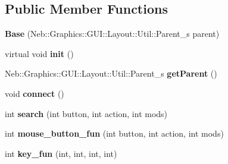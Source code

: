 \subsection*{Public Member Functions}
\begin{DoxyCompactItemize}
\item 
\hypertarget{classNeb_1_1Graphics_1_1GUI_1_1Layout_1_1Base_a1b2f473c9113eece88467beca024a215}{{\bfseries Base} (Neb\-::\-Graphics\-::\-G\-U\-I\-::\-Layout\-::\-Util\-::\-Parent\-\_\-s parent)}\label{classNeb_1_1Graphics_1_1GUI_1_1Layout_1_1Base_a1b2f473c9113eece88467beca024a215}

\item 
\hypertarget{classNeb_1_1Graphics_1_1GUI_1_1Layout_1_1Base_a7d4eefbfaf39c14f80c34a50e483e226}{virtual void {\bfseries init} ()}\label{classNeb_1_1Graphics_1_1GUI_1_1Layout_1_1Base_a7d4eefbfaf39c14f80c34a50e483e226}

\item 
\hypertarget{classNeb_1_1Graphics_1_1GUI_1_1Layout_1_1Base_af784b6ba641476e369e1665766a6f6a3}{Neb\-::\-Graphics\-::\-G\-U\-I\-::\-Layout\-::\-Util\-::\-Parent\-\_\-s {\bfseries get\-Parent} ()}\label{classNeb_1_1Graphics_1_1GUI_1_1Layout_1_1Base_af784b6ba641476e369e1665766a6f6a3}

\item 
\hypertarget{classNeb_1_1Graphics_1_1GUI_1_1Layout_1_1Base_ae427bfc003d7f02081ec340790dedba5}{void {\bfseries connect} ()}\label{classNeb_1_1Graphics_1_1GUI_1_1Layout_1_1Base_ae427bfc003d7f02081ec340790dedba5}

\item 
\hypertarget{classNeb_1_1Graphics_1_1GUI_1_1Layout_1_1Base_aa51592ea353a7921c9172bcd612047a4}{int {\bfseries search} (int button, int action, int mods)}\label{classNeb_1_1Graphics_1_1GUI_1_1Layout_1_1Base_aa51592ea353a7921c9172bcd612047a4}

\item 
\hypertarget{classNeb_1_1Graphics_1_1GUI_1_1Layout_1_1Base_a3207514a6c4b8be12165a930de390ebb}{int {\bfseries mouse\-\_\-button\-\_\-fun} (int button, int action, int mods)}\label{classNeb_1_1Graphics_1_1GUI_1_1Layout_1_1Base_a3207514a6c4b8be12165a930de390ebb}

\item 
\hypertarget{classNeb_1_1Graphics_1_1GUI_1_1Layout_1_1Base_a7da0d6f91d6db9e6d91cbd938b36d9d7}{int {\bfseries key\-\_\-fun} (int, int, int, int)}\label{classNeb_1_1Graphics_1_1GUI_1_1Layout_1_1Base_a7da0d6f91d6db9e6d91cbd938b36d9d7}

\end{DoxyCompactItemize}
